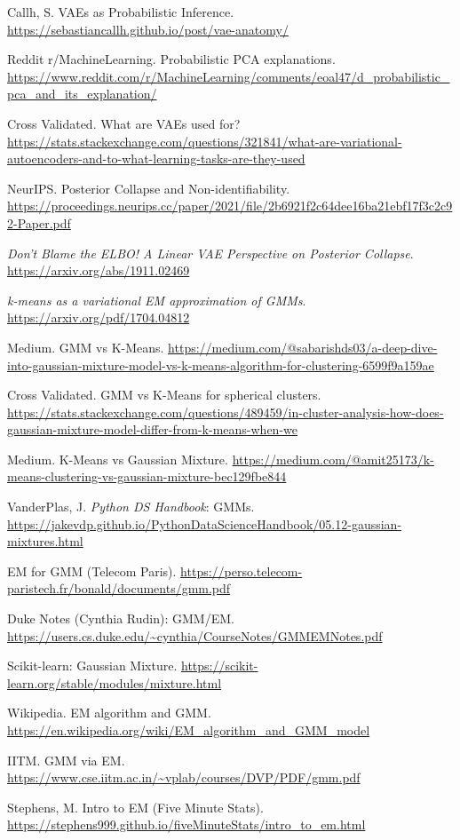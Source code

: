 \documentclass[11pt]{article}
\begin{document}
\begin{enumerate}[leftmargin=1.2em,label={[\arabic*]}]
\item Callh, S. VAEs as Probabilistic Inference. \url{https://sebastiancallh.github.io/post/vae-anatomy/}
\item Reddit r/MachineLearning. Probabilistic PCA explanations. \url{https://www.reddit.com/r/MachineLearning/comments/eoal47/d_probabilistic_pca_and_its_explanation/}
\item Cross Validated. What are VAEs used for? \url{https://stats.stackexchange.com/questions/321841/what-are-variational-autoencoders-and-to-what-learning-tasks-are-they-used}
\item NeurIPS. Posterior Collapse and Non-identifiability. \url{https://proceedings.neurips.cc/paper/2021/file/2b6921f2c64dee16ba21ebf17f3c2c92-Paper.pdf}
\item \emph{Don't Blame the ELBO! A Linear VAE Perspective on Posterior Collapse}. \url{https://arxiv.org/abs/1911.02469}
\item \emph{k-means as a variational EM approximation of GMMs}. \url{https://arxiv.org/pdf/1704.04812}
\item Medium. GMM vs K-Means. \url{https://medium.com/@sabarishds03/a-deep-dive-into-gaussian-mixture-model-vs-k-means-algorithm-for-clustering-6599f9a159ae}
\item Cross Validated. GMM vs K-Means for spherical clusters. \url{https://stats.stackexchange.com/questions/489459/in-cluster-analysis-how-does-gaussian-mixture-model-differ-from-k-means-when-we}
\item Medium. K-Means vs Gaussian Mixture. \url{https://medium.com/@amit25173/k-means-clustering-vs-gaussian-mixture-bec129fbe844}
\item VanderPlas, J. \emph{Python DS Handbook}: GMMs. \url{https://jakevdp.github.io/PythonDataScienceHandbook/05.12-gaussian-mixtures.html}
\item EM for GMM (Telecom Paris). \url{https://perso.telecom-paristech.fr/bonald/documents/gmm.pdf}
\item Duke Notes (Cynthia Rudin): GMM/EM. \url{https://users.cs.duke.edu/~cynthia/CourseNotes/GMMEMNotes.pdf}
\item Scikit-learn: Gaussian Mixture. \url{https://scikit-learn.org/stable/modules/mixture.html}
\item Wikipedia. EM algorithm and GMM. \url{https://en.wikipedia.org/wiki/EM_algorithm_and_GMM_model}
\item IITM. GMM via EM. \url{https://www.cse.iitm.ac.in/~vplab/courses/DVP/PDF/gmm.pdf}
\item Stephens, M. Intro to EM (Five Minute Stats). \url{https://stephens999.github.io/fiveMinuteStats/intro_to_em.html}

\end{enumerate}
\end{document}
